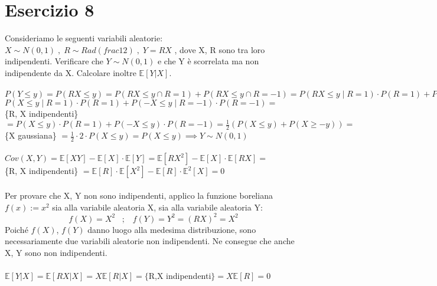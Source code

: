 \documentclass{article}
\begin{document}
\section*{Esercizio 8}
Consideriamo le seguenti variabili aleatorie: $X \sim N(0,1) \; , \; R \sim Rad(frac{1}{2}) \; , \; Y = RX$ , dove X, R sono tra loro indipendenti. Verificare che $Y \sim N(0,1)$ e che Y è scorrelata ma non indipendente da X. Calcolare inoltre $\mathbb{E}[Y|X]$.\\
\\
$P(Y \leq y) = P(RX \leq y) = P(RX \leq y \cap R=1) + P(RX \leq y \cap R=-1) = P(RX \leq y \; | \; R=1) \cdot P(R=1) + P(RX \leq y \; | \; R=-1) \cdot P(R=-1) =$\\
$P(X \leq y \; | \; R=1) \cdot P(R=1) + P(-X \leq y \; | \; R=-1) \cdot P(R=-1) =$\\
\{R, X indipendenti\} $= P(X \leq y) \cdot P(R=1) + P(-X \leq y) \cdot P(R=-1) = \frac{1}{2}(P(X \leq y) + P(X \geq -y)) =$\\
\{X gaussiana\} $= \frac{1}{2} \cdot 2 \cdot P(X \leq y) = P(X \leq y) \implies Y \sim N(0,1)$\\
\\
$Cov(X,Y) = \mathbb{E}[XY] - \mathbb{E}[X]\cdot \mathbb{E}[Y] = \mathbb{E}[RX^{2}] - \mathbb{E}[X]\cdot \mathbb{E}[RX] =$\\
\{R, X indipendenti\} $= \mathbb{E}[R]\cdot \mathbb{E}[X^{2}] - \mathbb{E}[R]\cdot \mathbb{E}^{2}[X] = 0$\\
\\
Per provare che X, Y non sono indipendenti, applico la funzione boreliana $f(x) := x^{2}$ sia alla variabile aleatoria X, sia alla variabile aleatoria Y:
\[ f(X) = X^{2} \; \; \; ; \; \; \; f(Y) = Y^{2} = (RX)^{2} = X^{2} \]
Poiché $f(X)$, $f(Y)$ danno luogo alla medesima distribuzione, sono necessariamente due variabili aleatorie non indipendenti. Ne consegue che anche X, Y sono non indipendenti.\\
\\
$\mathbb{E}[Y|X] = \mathbb{E}[RX|X] = X\mathbb{E}[R|X] = \{$R,X indipendenti$\} = X\mathbb{E}[R] = 0$
\end{document}
